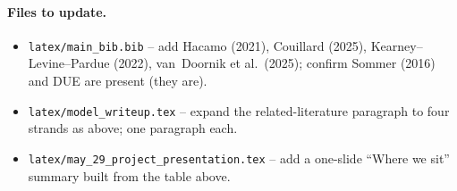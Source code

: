 \documentclass[11pt]{article}
\begin{document}
\paragraph{Files to update.}
\begin{itemize}
\item \texttt{latex/main\_bib.bib} -- add Hacamo (2021), Couillard (2025), Kearney--Levine--Pardue (2022), van~Doornik et al.\ (2025); confirm Sommer (2016) and DUE are present (they are).
\item \texttt{latex/model\_writeup.tex} -- expand the related-literature paragraph to four strands as above; one paragraph each.
\item \texttt{latex/may\_29\_project\_presentation.tex} -- add a one-slide ``Where we sit'' summary built from the table above.
\end{itemize}
\end{document}
